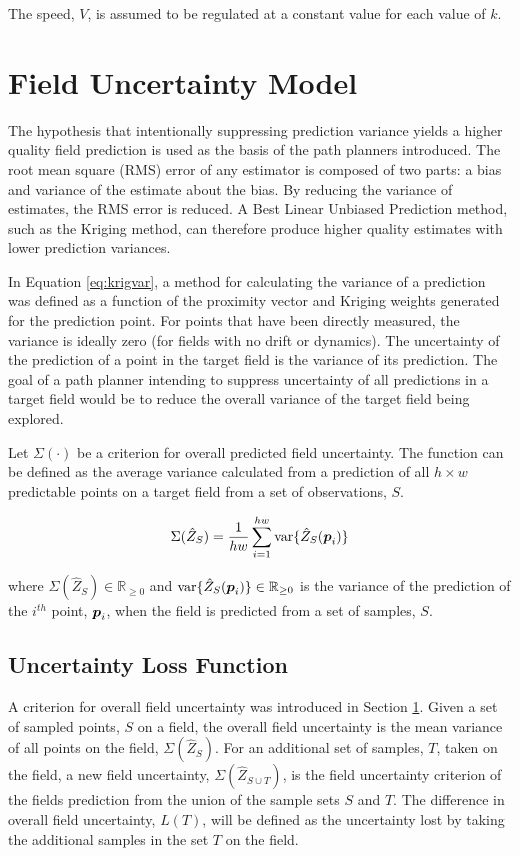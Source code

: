 The speed, $V$, is assumed to be regulated at a constant value for each value of $k$.

\section{Field Uncertainty Model} \label{sec:fielduncert}
The hypothesis that intentionally suppressing prediction variance yields a higher quality field prediction is used as the basis of the path planners introduced. The root mean square (RMS) error of any estimator is composed of two parts: a bias and variance of the estimate about the bias. By reducing the variance of estimates, the RMS error is reduced. A Best Linear Unbiased Prediction method, such as the Kriging method, can therefore produce higher quality estimates with lower prediction variances.

In Equation \ref{eq:krigvar}, a method for calculating the variance of a prediction was defined as a function of the proximity vector and Kriging weights generated for the prediction point. For points that have been directly measured, the variance is ideally zero (for fields with no drift or dynamics). The uncertainty of the prediction of a point in the target field is the variance of its prediction. The goal of a path planner intending to suppress uncertainty of all predictions in a target field would be to reduce the overall variance of the target field being explored.

Let $\Sigma(\cdot)$ be a criterion for overall predicted field uncertainty. The function can be defined as the average variance calculated from a prediction of all $h\times w$ predictable points on a target field from a set of observations, $S$.

\begin{equation}
	\Sigma(\hat{Z}_{S}) = \frac{1}{hw}\sum_{i = 1}^{hw} \text{var}\{\hat{Z}_{S}({\it{\boldsymbol{p}}}_i)\}
	\label{eq:fielduncert}
\end{equation}

\noindent where $\Sigma(\hat{Z}_{S}) \in \mathbb{R}_{\geq 0}$ and $\text{var}\{\hat{Z}_{S}({\it{\boldsymbol{p}}}_i)\} \in \mathbb{R}_{\geq 0}$ is the variance of the prediction of the $i^{th}$ point, ${\it{\boldsymbol{p}}}_i$, when the field is predicted from a set of samples, $S$.

\subsection{Uncertainty Loss Function} \label{sec:lossfunc}
A criterion for overall field uncertainty was introduced in Section \ref{sec:fielduncert}. Given a set of sampled points, $S$ on a field, the overall field uncertainty is the mean variance of all points on the field, $\Sigma(\hat{Z}_{S})$. For an additional set of samples, $T$, taken on the field, a new field uncertainty, $\Sigma(\hat{Z}_{S \cup T})$, is the field uncertainty criterion of the fields prediction from the union of the sample sets $S$ and $T$. The difference in overall field uncertainty, $L(T)$, will be defined as the uncertainty lost by taking the additional samples in the set $T$ on the field.


